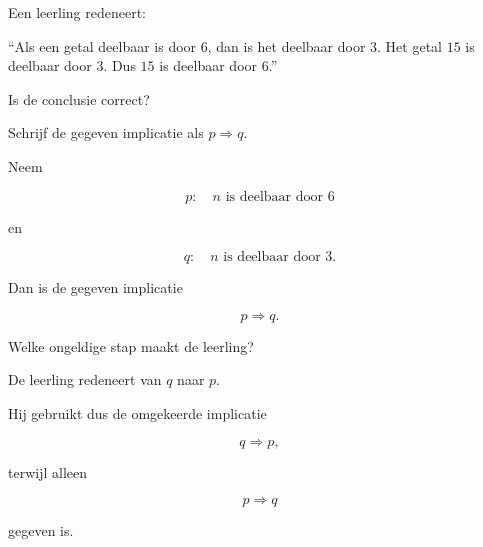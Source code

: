 \documentclass{ximera}
\begin{document}
\begin{oefening}{\oefU\ESS}

Een leerling redeneert:

\begin{center}
``Als een getal deelbaar is door $6$, dan is het deelbaar door $3$.
Het getal $15$ is deelbaar door $3$.
Dus $15$ is deelbaar door $6$.''
\end{center}

\begin{question}

Is de conclusie correct?

\begin{multipleChoice}



\end{multipleChoice}

\end{question}


\begin{question}

Schrijf de gegeven implicatie als $p\Rightarrow q$.

\begin{oplossing}

Neem

\[
p:\quad n\text{ is deelbaar door }6
\]

en

\[
q:\quad n\text{ is deelbaar door }3.
\]

Dan is de gegeven implicatie

\[
p\Rightarrow q.
\]

\end{oplossing}

\end{question}


\begin{question}

Welke ongeldige stap maakt de leerling?

\begin{oplossing}

De leerling redeneert van $q$ naar $p$.

Hij gebruikt dus de omgekeerde implicatie

\[
q\Rightarrow p,
\]

terwijl alleen

\[
p\Rightarrow q
\]

gegeven is.

\end{oplossing}

\end{question}

\end{oefening}
\end{document}
